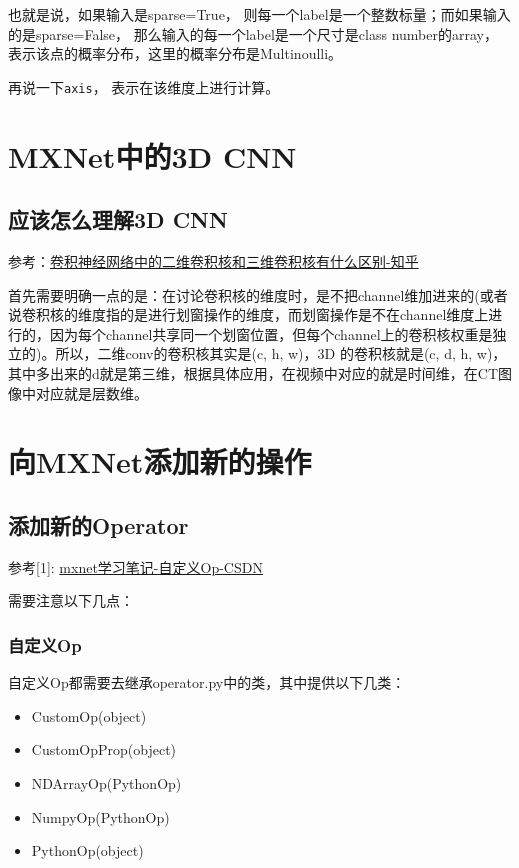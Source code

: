 也就是说，如果输入是sparse=True， 则每一个label是一个整数标量；而如果输入的是sparse=False， 那么输入的每一个label是一个尺寸是class number的array， 表示该点的概率分布，这里的概率分布是Multinoulli。

再说一下\verb|axis|， 表示在该维度上进行计算。

\section{MXNet中的3D CNN}

\subsection{应该怎么理解3D CNN}

参考：\href{https://www.zhihu.com/question/266352189}{卷积神经网络中的二维卷积核和三维卷积核有什么区别-知乎}

首先需要明确一点的是：在讨论卷积核的维度时，是不把channel维加进来的(或者说卷积核的维度指的是进行划窗操作的维度，而划窗操作是不在channel维度上进行的，因为每个channel共享同一个划窗位置，但每个channel上的卷积核权重是独立的)。所以，二维conv的卷积核其实是(c, h, w)，3D 的卷积核就是(c, d, h, w)，其中多出来的d就是第三维，根据具体应用，在视频中对应的就是时间维，在CT图像中对应就是层数维。

\section{向MXNet添加新的操作}

\subsection{添加新的Operator}

参考[1]: \href{https://blog.csdn.net/u011765306/article/details/54562282}{mxnet学习笔记-自定义Op-CSDN}

需要注意以下几点：


\subsubsection{自定义Op}

自定义Op都需要去继承operator.py中的类，其中提供以下几类：
\begin{itemize}
\item CustomOp(object)
\item CustomOpProp(object)
\item NDArrayOp(PythonOp)
\item NumpyOp(PythonOp)
\item PythonOp(object)
\end{itemize}

